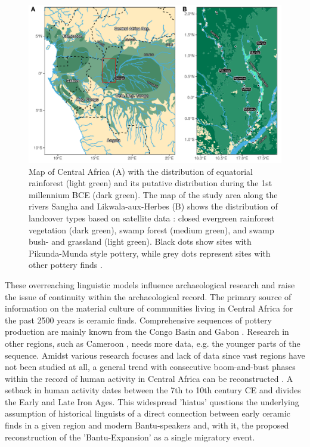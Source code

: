 \documentclass[smallextended,natbib]{svjour3}       %
\begin{document}
\begin{figure}[!tb]
	\includegraphics[width=\textwidth]{Fig_Map.pdf}
	\caption{Map of Central Africa (A) with the distribution of equatorial rainforest \citep{White.1983} (light green) and its putative distribution during the 1st millennium BCE \citep{Bremond.2017,Maley.2017} (dark green). The map of the study area along the rivers Sangha and Likwala-aux-Herbes (B) shows the distribution of landcover types based on satellite data \citep{Mayaux.2003}: closed evergreen rainforest vegetation (dark green), swamp forest (medium green), and swamp bush- and grassland (light green). Black dots show sites with Pikunda-Munda style pottery, while grey dots represent sites with other pottery finds \citep[11 Fig.~1, 119 Fig.~49]{Seidensticker.2021e}.}
	\label{fig:map}
\end{figure}

These overreaching linguistic models influence archaeological research and raise the issue of continuity within the archaeological record. The primary source of information on the material culture of communities living in Central Africa for the past 2500 years is ceramic finds. Comprehensive sequences of pottery production are mainly known from the Congo Basin \citep{Wotzka.1995,Seidensticker.2021e} and Gabon \citep{Clist.20042005}. Research in other regions, such as Cameroon \citep{GouemGouem.20102011,NlendNlend.20132014}, needs more data, e.g. the younger parts of the sequence. Amidst various research focuses and lack of data since vast regions have not been studied at all, a general trend with consecutive boom-and-bust phases within the record of human activity in Central Africa can be reconstructed \citep{Oslisly.1998,Oslisly.2013,Oslisly.2013b,Saulieu.2017,deSaulieu.2021a,Seidensticker.2021}. A setback in human activity dates between the 7th to 10th century CE and divides the Early and Late Iron Ages. This widespread 'hiatus' questions the underlying assumption of historical linguists \citep{Grollemund.2015,Bostoen.2015,Koile.2022} of a direct connection between early ceramic finds in a given region and modern Bantu-speakers and, with it, the proposed reconstruction of the 'Bantu-Expansion' as a single migratory event.
\end{document}
